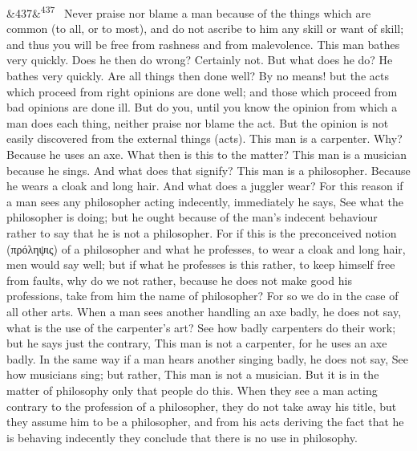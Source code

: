 \documentclass[12pt]{article}
\newcommand{\para}[1][]{\par\noindent\ifx&#1&\else\textsuperscript{\footnotesize #1}~\fi}
\begin{document}
\para[437] Never praise nor blame a man because of the things which are common (to all, or to most), and do not ascribe to him any skill or want of skill; and thus you will be free from rashness and from malevolence. This man bathes very quickly. Does he then do wrong? Certainly not. But what does he do? He bathes very quickly. Are all things then done well? By no means! but the acts which proceed from right opinions are done well; and those which proceed from bad opinions are done ill. But do you, until you know the opinion from which a man does each thing, neither praise nor blame the act. But the opinion is not easily discovered from the external things (acts). This man is a carpenter. Why? Because he uses an axe. What then is this to the matter? This man is a musician because he sings. And what does that signify? This man is a philosopher. Because he wears a cloak and long hair. And what does a juggler wear? For this reason if a man sees any philosopher acting indecently, immediately he says, See what the philosopher is doing; but he ought because of the man's indecent behaviour rather to say that he is not a philosopher. For if this is the preconceived notion (πρόληψις) of a philosopher and what he professes, to wear a cloak and long hair, men would say well; but if what he professes is this rather, to keep himself free from faults, why do we not rather, because he does not make good his professions, take from him the name of philosopher? For so we do in the case of all other arts. When a man sees another handling an axe badly, he does not say, what is the use of the carpenter's art? See how badly carpenters do their work; but he says just the contrary, This man is not a carpenter, for he uses an axe badly. In the same way if a man hears another singing badly, he does not say, See how musicians sing; but rather, This man is not a musician. But it is in the matter of philosophy only that people do this. When they see a man acting contrary to the profession of a philosopher, they do not take away his title, but they assume him to be a philosopher, and from his acts deriving the fact that he is behaving indecently they conclude that there is no use in philosophy.
\end{document}
